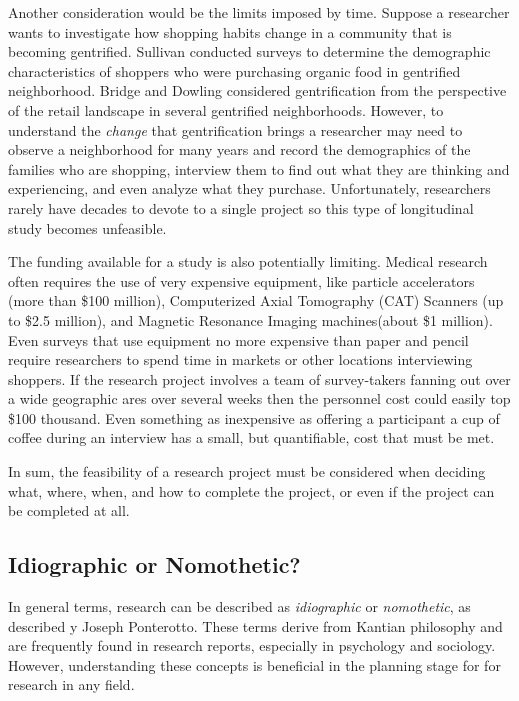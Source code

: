 Another consideration would be the limits imposed by time. Suppose a researcher wants to investigate how shopping habits change in a community that is becoming gentrified. Sullivan\cite{sullivan2014food} conducted surveys to determine the demographic characteristics of shoppers who were purchasing organic food in gentrified neighborhood. Bridge and Dowling\cite{bridge2001microgeographies} considered gentrification from the perspective of the retail landscape in several gentrified neighborhoods. However, to understand the \textit{change} that gentrification brings a researcher may need to observe a neighborhood for many years and record the demographics of the families who are shopping, interview them to find out what they are thinking and experiencing, and even analyze what they purchase. Unfortunately, researchers rarely have decades to devote to a single project so this type of longitudinal study becomes unfeasible.

The funding available for a study is also potentially limiting. Medical research often requires the use of very expensive equipment, like particle accelerators (more than \$100 million), Computerized Axial Tomography (CAT) Scanners (up to \$2.5 million), and Magnetic Resonance Imaging machines(about \$1 million). Even surveys that use equipment no more expensive than paper and pencil require researchers to spend time in markets or other locations interviewing shoppers. If the research project involves a team of survey-takers fanning out over a wide geographic ares over several weeks then the personnel cost could easily top \$100 thousand. Even something as inexpensive as offering a participant a cup of coffee during an interview has a small, but quantifiable, cost that must be met.

In sum, the feasibility of a research project must be considered when deciding what, where, when, and how to complete the project, or even if the project can be completed at all.

\subsection{Idiographic or Nomothetic?}

In general terms, research can be described as \textit{idiographic} or \textit{nomothetic}, as described y Joseph Ponterotto\cite{ponterotto2005qualitative}. These terms derive from Kantian philosophy and are frequently found in research reports, especially in psychology and sociology. However, understanding these concepts is beneficial in the planning stage for for research in any field.

